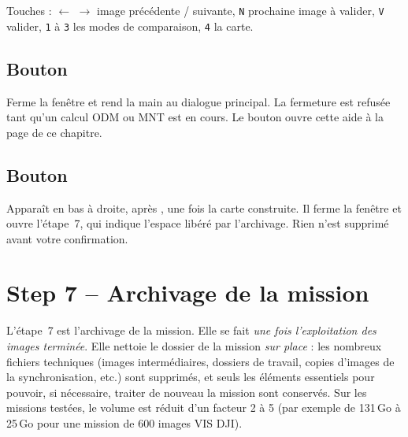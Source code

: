 \documentclass[a4paper,11pt]{report}
\DeclareRobustCommand{\bouton}[1]{\texorpdfstring{\fbox{\small\textsf{#1}}}{#1}}
\begin{document}
Touches : \(\leftarrow\) \(\rightarrow\) image précédente / suivante, \texttt{N} prochaine image à valider, \texttt{V} valider, \texttt{1} à \texttt{3} les modes de comparaison, \texttt{4} la carte.

\section{Bouton \bouton{Close}}\label{btn:step6_close}
Ferme la fenêtre et rend la main au dialogue principal. La fermeture est refusée tant qu'un calcul ODM ou MNT est en cours. Le bouton \bouton{?} ouvre cette aide à la page de ce chapitre.

\section{Bouton \bouton{Continue with archiving}}\label{btn:step6_continue}
Apparaît en bas à droite, après \bouton{Close}, une fois la carte construite. Il ferme la fenêtre et ouvre l'étape~7, qui indique l'espace libéré par l'archivage. Rien n'est supprimé avant votre confirmation.

\chapter{Step 7 -- Archivage de la mission}\label{ch:step7}
L'étape~7 est l'archivage de la mission. Elle se fait \emph{une fois l'exploitation des images terminée}. Elle nettoie le dossier de la mission \emph{sur place} :
les nombreux fichiers techniques (images intermédiaires, dossiers de travail, copies d'images de la synchronisation, etc.) sont supprimés,
et seuls les éléments essentiels pour pouvoir, si nécessaire, traiter de nouveau la mission sont conservés. Sur les missions testées, le volume est réduit
d'un facteur 2 à 5 (par exemple de 131\,Go à 25\,Go pour une mission de 600 images VIS DJI).

\begin{center}
\end{center}
\end{document}
